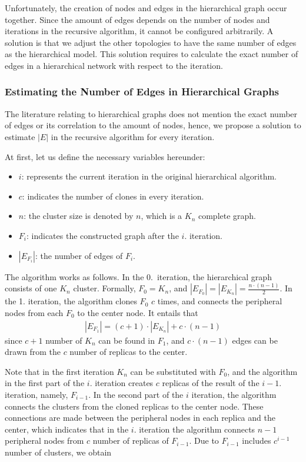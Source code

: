 Unfortunately, the creation of nodes and edges in the hierarchical graph occur together. Since the amount of edges depends on the number of nodes and iterations in the recursive algorithm, it cannot be configured arbitrarily. A solution is that we adjust the other topologies to have the same number of edges as the hierarchical model. This solution requires to calculate the exact number of edges in a hierarchical network with respect to the iteration.

\subsubsection{Estimating the Number of Edges in Hierarchical Graphs}

The literature relating to hierarchical graphs does not mention the exact number of edges or its correlation to the amount of nodes, hence, we propose a solution to estimate $|E|$ in the recursive algorithm for every iteration.

At first, let us define the necessary variables hereunder:
\begin{itemize}
	\item{$i$}: represents the current iteration in the original hierarchical algorithm.
	\item{$c$}: indicates the number of clones in every iteration.
	\item{$n$}: the cluster size is denoted by $n$, which is a $K_n$ complete graph.
	\item{$F_i$}: indicates the constructed graph after the $i.$ iteration. %
	\item{$|E_{F_i}|$}: the number of edges of $F_i$.
\end{itemize}

The algorithm works as follows. In the 0.~iteration, the hierarchical graph consists of one $K_n$ cluster. Formally, $F_0 = K_n$, and $|E_{F_0}| = |E_{K_n}| = \frac{n \cdot (n-1)}{2}$. In the 1. iteration, the algorithm clones $F_0$ $c$ times, and connects the peripheral nodes from each $F_0$ to the center node. It entails that 
\begin{align}\label{eq:f1_version1}
	|E_{F_1}| = (c+1) \cdot |E_{K_n}| + c \cdot (n - 1)	
\end{align}
since $c+1$ number of $K_n$ can be found in $F_1$, and $c \cdot (n - 1)$ edges can be drawn from the $c$ number of replicas to the center.

Note that in the first iteration $K_n$ can be substituted with $F_0$, and the algorithm in the first part of the $i.$ iteration creates $c$ replicas of the result of the $i-1.$ iteration, namely, $F_{i-1}$. In the second part of the $i$ iteration, the algorithm connects the clusters from the cloned replicas to the center node. These connections are made between the peripheral nodes in each replica and the center, which indicates that in the $i.$ iteration the algorithm connects $n-1$ peripheral nodes from $c$ number of replicas of $F_{i-1}$. Due to $F_{i-1}$ includes $c^{i-1}$ number of clusters, we obtain

